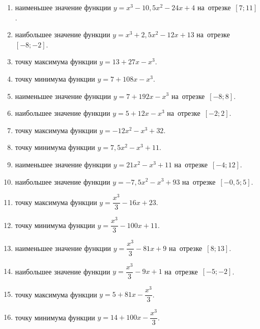\documentclass[a4paper,10pt]{article}
\begin{document}
\begin{enumerate}
\item {} наименьшее значение функции $y=x^3 -10,5x^2-24x+4$ на~отрезке~$\left[7;11\right]$.

\item {} наибольшее значение функции $y=x^3 +2,5x^2-12x+13$ на~отрезке~$\left[-8;-2\right]$.

\item {} точку максимума функции $y=13+27x-x^3$.

\item {} точку минимума функции $y=7+108x-x^3$.

\item {} наименьшее значение функции $y=7+192x-x^3$ на~отрезке~$\left[-8;8\right]$.

\item {} наибольшее значение функции $y=5+12x-x^3$ на~отрезке~$\left[-2;2\right]$.

\item {} точку максимума функции $y=-12x^2-x^3+32$.

\item {} точку минимума функции $y=7,5x^2-x^3+11$.

\item {} наименьшее значение функции $y=21x^2-x^3+11$ на~отрезке~$\left[-4;12\right]$.

\item {} наибольшее значение функции $y=-7,5x^2-x^3+93$ на~отрезке~$\left[-0,5;5\right]$.

\item {} точку максимума функции $y=\dfrac{x^3}{3} -16x+23$.

\item {} точку минимума функции $y=\dfrac{x^3}{3} -100x+11$.

\item {} наименьшее значение функции $y=\dfrac{x^3}{3} -81x+9$ на~отрезке~$\left[8;13\right]$.

\item {} наибольшее значение функции $y=\dfrac{x^3}{3} -9x+1$ на~отрезке~$\left[-5;-2\right]$.

\item {} точку максимума функции $y=5 +81x-\dfrac{x^3}{3}$.

\item {} точку минимума функции $y=14 +100x-\dfrac{x^3}{3}$.


\end{enumerate}
\end{document}
